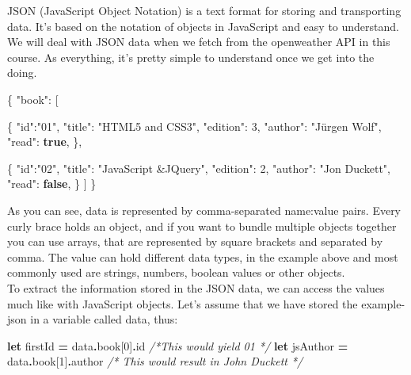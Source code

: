 \documentclass[
]{article}
\newenvironment{Shaded}{\begin{snugshade}}{\end{snugshade}}
\newcommand{\AttributeTok}[1]{\textcolor[rgb]{0.77,0.63,0.00}{#1}}
\newcommand{\CommentTok}[1]{\textcolor[rgb]{0.56,0.35,0.01}{\textit{#1}}}
\newcommand{\DataTypeTok}[1]{\textcolor[rgb]{0.13,0.29,0.53}{#1}}
\newcommand{\DecValTok}[1]{\textcolor[rgb]{0.00,0.00,0.81}{#1}}
\newcommand{\FunctionTok}[1]{\textcolor[rgb]{0.00,0.00,0.00}{#1}}
\newcommand{\KeywordTok}[1]{\textcolor[rgb]{0.13,0.29,0.53}{\textbf{#1}}}
\newcommand{\NormalTok}[1]{#1}
\newcommand{\OperatorTok}[1]{\textcolor[rgb]{0.81,0.36,0.00}{\textbf{#1}}}
\newcommand{\OtherTok}[1]{\textcolor[rgb]{0.56,0.35,0.01}{#1}}
\newcommand{\StringTok}[1]{\textcolor[rgb]{0.31,0.60,0.02}{#1}}
\begin{document}
JSON (JavaScript Object Notation) is a text format for storing and transporting data. It's based on the notation of objects in JavaScript and easy to understand. We will deal with JSON data when we fetch from the openweather API in this course. As everything, it's pretty simple to understand once we get into the doing.

\begin{Shaded}
\begin{Highlighting}[]
\FunctionTok{\{}
   \DataTypeTok{"book"}\FunctionTok{:} \OtherTok{[}
    
      \FunctionTok{\{}
         \DataTypeTok{"id"}\FunctionTok{:}\StringTok{"01"}\FunctionTok{,}
         \DataTypeTok{"title"}\FunctionTok{:} \StringTok{"HTML5 and CSS3"}\FunctionTok{,}
         \DataTypeTok{"edition"}\FunctionTok{:} \DecValTok{3}\FunctionTok{,}
         \DataTypeTok{"author"}\FunctionTok{:} \StringTok{"Jürgen Wolf"}\FunctionTok{,}
         \DataTypeTok{"read"}\FunctionTok{:} \KeywordTok{true}\FunctionTok{,}
      \FunctionTok{\}}\OtherTok{,}
    
      \FunctionTok{\{}
         \DataTypeTok{"id"}\FunctionTok{:}\StringTok{"02"}\FunctionTok{,}
         \DataTypeTok{"title"}\FunctionTok{:} \StringTok{"JavaScript \&JQuery"}\FunctionTok{,}
         \DataTypeTok{"edition"}\FunctionTok{:} \DecValTok{2}\FunctionTok{,}
         \DataTypeTok{"author"}\FunctionTok{:} \StringTok{"Jon Duckett"}\FunctionTok{,}
         \DataTypeTok{"read"}\FunctionTok{:} \KeywordTok{false}\FunctionTok{,}
      \FunctionTok{\}}
   \OtherTok{]}
\FunctionTok{\}}
\end{Highlighting}
\end{Shaded}

As you can see, data is represented by comma-separated name:value pairs. Every curly brace holds an object, and if you want to bundle multiple objects together you can use arrays, that are represented by square brackets and separated by comma. The value can hold different data types, in the example above and most commonly used are strings, numbers, boolean values or other objects.\\
To extract the information stored in the JSON data, we can access the values much like with JavaScript objects. Let's assume that we have stored the example-json in a variable called data, thus:

\begin{Shaded}
\begin{Highlighting}[]
\KeywordTok{let}\NormalTok{ firstId }\OperatorTok{=}\NormalTok{ data}\OperatorTok{.}\AttributeTok{book}\NormalTok{[}\DecValTok{0}\NormalTok{]}\OperatorTok{.}\AttributeTok{id} \CommentTok{/*This would yield 01 */}
\KeywordTok{let}\NormalTok{ jsAuthor }\OperatorTok{=}\NormalTok{ data}\OperatorTok{.}\AttributeTok{book}\NormalTok{[}\DecValTok{1}\NormalTok{]}\OperatorTok{.}\AttributeTok{author} \CommentTok{/* This would result in John Duckett */}  
\end{Highlighting}
\end{Shaded}
\end{document}

